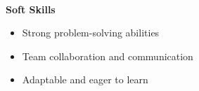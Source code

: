 \begin{flushleft}
    \hrulefill \\
    \begin{large}
        \begin{center}\textbf{Soft Skills}\end{center}
    \end{large} 
\end{flushleft}
\begin{itemize}
    \item Strong problem-solving abilities
    \item Team collaboration and communication
    \item Adaptable and eager to learn
\end{itemize}
